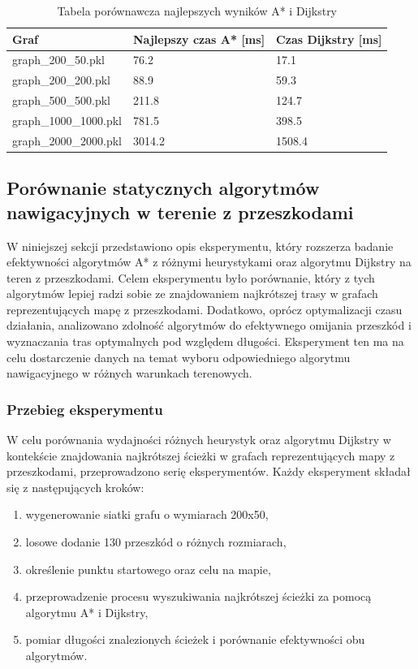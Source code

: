 \documentclass[12pt,twoside]{article}
\begin{document}
\begin{table}[ht]
\caption{Tabela porównawcza najlepszych wyników A* i Dijkstry}
\centering		
\begin{tabular}{|p{}|p{}|p{}|}	
\hline
Graf & Najlepszy czas A* [ms] & Czas Dijkstry [ms] \\
\hline
graph\_200\_50.pkl & 
76.2 & 
17.1 \\
graph\_200\_200.pkl & 
88.9 & 
59.3 \\
graph\_500\_500.pkl & 
211.8 & 
124.7 \\
graph\_1000\_1000.pkl & 
781.5 & 
398.5 \\
graph\_2000\_2000.pkl & 
3014.2 & 
1508.4 \\
\hline
\end{tabular}	

\label{Tab:comparison}
\end{table}

\clearpage

\subsection{Porównanie statycznych algorytmów nawigacyjnych w terenie z przeszkodami}

W niniejszej sekcji przedstawiono opis eksperymentu, który rozszerza badanie efektywności algorytmów A* z różnymi heurystykami oraz algorytmu Dijkstry na teren z przeszkodami. Celem eksperymentu było porównanie, który z tych algorytmów lepiej radzi sobie ze znajdowaniem najkrótszej trasy w grafach reprezentujących mapę z przeszkodami. Dodatkowo, oprócz optymalizacji czasu działania, analizowano zdolność algorytmów do efektywnego omijania przeszkód i wyznaczania tras optymalnych pod względem długości. Eksperyment ten ma na celu dostarczenie danych na temat wyboru odpowiedniego algorytmu nawigacyjnego w różnych warunkach terenowych.

\subsubsection{Przebieg eksperymentu}

W celu porównania wydajności różnych heurystyk oraz algorytmu Dijkstry w kontekście znajdowania najkrótszej ścieżki w grafach reprezentujących mapy z przeszkodami, przeprowadzono serię eksperymentów. Każdy eksperyment składał się z następujących kroków:

\begin{enumerate}[label=\alph*), leftmargin=1.25cm]
    \item wygenerowanie siatki grafu o wymiarach 200x50,
    \item losowe dodanie 130 przeszkód o różnych rozmiarach,
    \item określenie punktu startowego oraz celu na mapie,
    \item przeprowadzenie procesu wyszukiwania najkrótszej ścieżki za pomocą algorytmu A* i Dijkstry,
    \item pomiar długości znalezionych ścieżek i porównanie efektywności obu algorytmów.
\end{enumerate}
\end{document}
